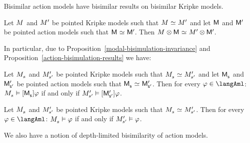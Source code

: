 Bisimilar action models have bisimilar results on bisimilar Kripke models.

\begin{proposition}\label{action-bisimulation-results}
Let $\kModel$ and ${M^{\prime}_{}}$ be pointed Kripke models such that $\kModel \bisimilar \kModelP$ and
let $\aModel$ and ${\mathsf{M}^{\prime}}$ be pointed action models such that $\aModel \bisimilar \aModelP$.
Then $\kModel \exec \aModel \bisimilar \kModelP \exec \aModelP$.
\end{proposition}

In particular, due to Proposition~\ref{modal-bisimulation-invariance} and Proposition~\ref{action-bisimulation-results} we have:

\begin{proposition}\label{aml-bisimilar-actions}
Let $\kPModel{\kStateS}$ and ${M^{\prime}_{{s}^{\prime}}}$ be pointed Kripke models such that $\kPModel{\kStateS} \bisimilar \kPModelP{\kStateSP}$ and
let $\aPModel{\aStateS}$ and ${\mathsf{M}^{\prime}_{{\mathsf{{s}}^{\prime}}}}$ be pointed action models such that $\aPModel{\aStateS} \bisimilar \aPModelP{\aStateSP}$.
Then for every $\phi \in \langAml$: $\kPModel{\kStateS} \entails \actionA{\aPModel{\aStateS}} \phi$ if and only if ${M^{\prime}_{{s}^{\prime}}} \vDash {[ {\ensuremath{{\mathsf{M}^{\prime}_{{\mathsf{{s}}^{\prime}}}}}} ]} \varphi$.
\end{proposition}

\begin{proposition}\label{aml-bisimulation-invariance}
Let $\kPModel{\kStateS}$ and ${M^{\prime}_{{s}^{\prime}}}$ be pointed Kripke models such that $\kPModel{\kStateS} \bisimilar \kPModelP{\kStateSP}$.
Then for every $\phi \in \langAml$: $\kPModel{\kStateS} \entails \phi$ if and only if ${M^{\prime}_{{s}^{\prime}}} \vDash \varphi$.
\end{proposition}

We also have a notion of depth-limited bisimilarity of action models.

